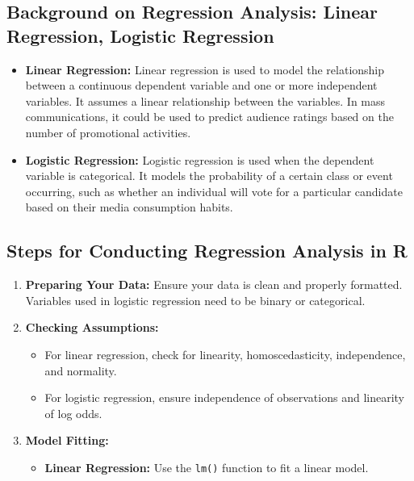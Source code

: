 \documentclass[
]{book}
\providecommand{\tightlist}{%
  \setlength{\itemsep}{0pt}\setlength{\parskip}{0pt}}
\begin{document}
\subsection*{Background on Regression Analysis: Linear Regression, Logistic Regression}\label{background-on-regression-analysis-linear-regression-logistic-regression}

\begin{itemize}
\item
  \textbf{Linear Regression:} Linear regression is used to model the relationship between a continuous dependent variable and one or more independent variables. It assumes a linear relationship between the variables. In mass communications, it could be used to predict audience ratings based on the number of promotional activities.
\item
  \textbf{Logistic Regression:} Logistic regression is used when the dependent variable is categorical. It models the probability of a certain class or event occurring, such as whether an individual will vote for a particular candidate based on their media consumption habits.
\end{itemize}

\subsection*{Steps for Conducting Regression Analysis in R}\label{steps-for-conducting-regression-analysis-in-r}

\begin{enumerate}
\def\labelenumi{\arabic{enumi}.}
\item
  \textbf{Preparing Your Data:} Ensure your data is clean and properly formatted. Variables used in logistic regression need to be binary or categorical.
\item
  \textbf{Checking Assumptions:}

  \begin{itemize}
  \tightlist
  \item
    For linear regression, check for linearity, homoscedasticity, independence, and normality.
  \item
    For logistic regression, ensure independence of observations and linearity of log odds.
  \end{itemize}
\item
  \textbf{Model Fitting:}

  \begin{itemize}
  \tightlist
  \item
    \textbf{Linear Regression:} Use the \texttt{lm()} function to fit a linear model.
  \end{itemize}
\end{enumerate}
\end{document}
